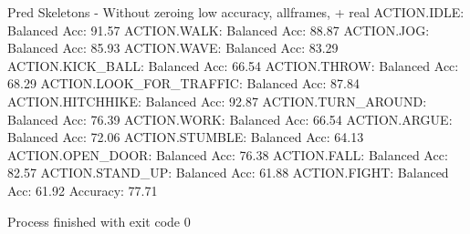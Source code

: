 Pred Skeletons - Without zeroing low accuracy, allframes, + real
ACTION.IDLE: Balanced Acc: 91.57%
ACTION.WALK: Balanced Acc: 88.87%
ACTION.JOG: Balanced Acc: 85.93%
ACTION.WAVE: Balanced Acc: 83.29%
ACTION.KICK_BALL: Balanced Acc: 66.54%
ACTION.THROW: Balanced Acc: 68.29%
ACTION.LOOK_FOR_TRAFFIC: Balanced Acc: 87.84%
ACTION.HITCHHIKE: Balanced Acc: 92.87%
ACTION.TURN_AROUND: Balanced Acc: 76.39%
ACTION.WORK: Balanced Acc: 66.54%
ACTION.ARGUE: Balanced Acc: 72.06%
ACTION.STUMBLE: Balanced Acc: 64.13%
ACTION.OPEN_DOOR: Balanced Acc: 76.38%
ACTION.FALL: Balanced Acc: 82.57%
ACTION.STAND_UP: Balanced Acc: 61.88%
ACTION.FIGHT: Balanced Acc: 61.92%
Accuracy: 77.71%

Process finished with exit code 0

